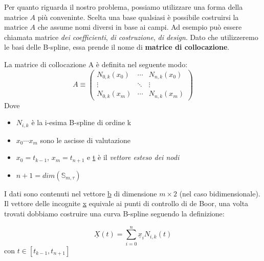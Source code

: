 \documentclass[../main.tex]{subfiles}
\begin{document}
Per quanto riguarda il nostro problema, possiamo utilizzare una forma della matrice $A$ più conveninte.
Scelta una base qualsiasi è possibile costruirsi la matrice $A$ che assume nomi diversi in base ai campi.
Ad esempio può essere chiamata matrice \textit{dei coefficienti}, \textit{di costruzione}, \textit{di design}.
Dato che utilizzeremo le basi delle B-spline, essa prende il nome di \textbf{matrice di collocazione}.

\begin{definition}
    La matrice di collocazione A è definita nel seguente modo:
    \begin{equation}
        A\equiv \begin{pmatrix}
            N_{0,k}(x_0) & \cdots & N_{n,k}(x_0) \\
            \vdots & \ddots & \vdots \\
            N_{0,k}(x_m) & \cdots & N_{n,k}(x_m)
        \end{pmatrix}
    \end{equation}
    Dove 
    \begin{itemize}
        \item $N_{i,k}$ è la i-esima B-spline di ordine k
        \item $x_0 \cdots x_m$ sono le ascisse di valutazione
        \item $x_0 = t_{k-1}$, $x_m = t_{n+1}$ e \underline{t} è il \textit{vettore esteso dei nodi}
        \item $n+1 = dim(\mathbb{S}_{m,\tau})$
    \end{itemize}
\end{definition}

I dati sono contenuti nel vettore \underline{b} di dimensione $m \times 2$ (nel caso bidimensionale).
Il vettore delle incognite \underline{x} equivale ai punti di controllo di de Boor, una volta trovati dobbiamo costruire una curva B-spline
seguendo la definizione:
\begin{definition}
    \begin{equation}
        \underline{X}(t) = \sum_{i=0}^{n} \underline{x}_iN_{i,k}(t)
    \end{equation}\label{eq:b-curve} 
    con $t \in [t_{k-1},t_{n+1}]$
\end{definition}
\end{document}
